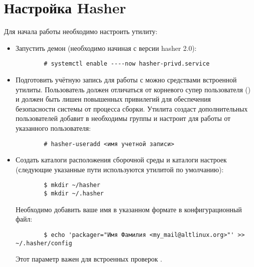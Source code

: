 \hypertarget{5.1}{\section{Настройка Hasher}}
Для начала работы необходимо настроить утилиту:
\begin{itemize}
	\item Запустить демон  (необходимо начиная с версии hasher 2.0):
	\begin{verbatim}
		# systemctl enable ----now hasher-privd.service
	\end{verbatim}
	
	\item Подготовить учётную запись для работы с  можно средствами встроенной утилиты.
	Пользователь должен отличаться от корневого супер пользователя () и должен быть
	лишен повышенных привилегий для обеспечения безопасности системы от процесса сборки.
	Утилита создаст дополнительных пользователей добавит в необходимы группы и настроит
	 для работы от указанного пользователя:
	\begin{verbatim}
		# hasher-useradd <имя учетной записи>
	\end{verbatim}
	
	\item Создать каталоги расположения сборочной среды и каталоги настроек (следующие указанные
	пути используются утилитой  по умолчанию):
	\begin{verbatim}
		$ mkdir ~/hasher
		$ mkdir ~/.hasher
	\end{verbatim}
	
	Необходимо добавить ваше имя в указанном формате в конфигурационный файл:
	\begin{verbatim}
		$ echo 'packager="Имя Фамилия <my_mail@altlinux.org>"' >> ~/.hasher/config
	\end{verbatim}
	Этот параметр важен для встроенных проверок .
	

\end{itemize}
